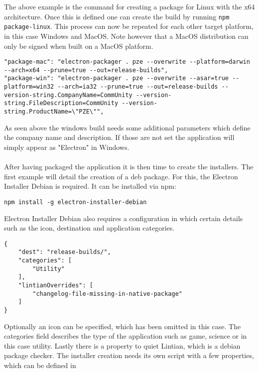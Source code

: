 The above example is the command for creating a package for Linux with the x64 architecture.
Once this is defined one can create the build by running \lstinline[columns=fixed]{npm package-linux}.
This process can now be repeated for each other target platform, in this case Windows and MacOS. 
Note however that a MacOS distribution can only be signed when built on a MacOS platform. \parencite{electronDocsDist}
\begin{lstlisting}[caption=Commands for Windows and MacOs builds specified in package.json]
"package-mac": "electron-packager . pze --overwrite --platform=darwin --arch=x64 --prune=true --out=release-builds",
"package-win": "electron-packager . pze --overwrite --asar=true --platform=win32 --arch=ia32 --prune=true --out=release-builds --version-string.CompanyName=CommUnity --version-string.FileDescription=CommUnity --version-string.ProductName=\"PZE\"",
\end{lstlisting}
As seen above the windows build needs some additional parameters which define the company name and description. 
If those are not set the application will simply appear as "Electron" in Windows. \parencite{winElectronAppStr}\paragraph{}
After having packaged the application it is then time to create the installers. 
The first example will detail the creation of a \acrshort{deb} package. 
For this, the Electron Installer Debian is required. 
It can be installed via \acrshort{npm}:
\begin{lstlisting}[caption=Installation of electron-installer-debian]
npm install -g electron-installer-debian
\end{lstlisting}
Electron Installer Debian also requires a configuration in which certain details such as the
icon, destination and application categories. 
\begin{lstlisting}[caption=Configuration for debian package: debian.json]
{
    "dest": "release-builds/",
    "categories": [
        "Utility"
    ],
    "lintianOverrides": [
        "changelog-file-missing-in-native-package"
    ]
}
\end{lstlisting}
Optionally an icon can be specified, which has been omitted in this case. 
The categories field describes the type of the application such as game, science or in this case utility.
Lastly there is a property to quiet Lintian, which is a debian package checker.
The installer creation needs its own script with a few properties, which can be defined in 
